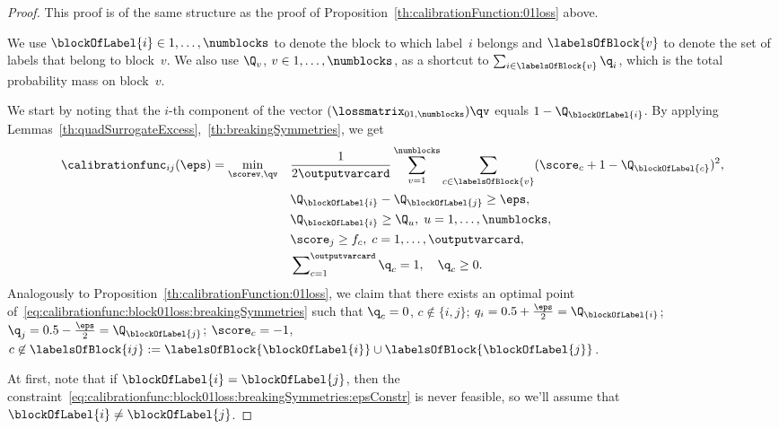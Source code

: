 \documentclass{article}
\begin{document}
\begin{proof}
    This proof is of the same structure as the proof of Proposition~\ref{th:calibrationFunction:01loss} above.
    
    We use $\blockOfLabel{i} \in 1,\dots,\numblocks$ to denote the block to which label~$i$ belongs and $\labelsOfBlock{v}$ to denote the set of labels that belong to block~$v$.
    We also use $\Q_v$, $v\in 1,\dots, \numblocks$, as a shortcut to $\sum_{i \in \labelsOfBlock{v}} \q_i$, which is the total probability mass on block~$v$.
    
    We start by noting that the $i$-th component of the vector $(\lossmatrix_{01,\numblocks}) \qv$ equals $1-\Q_{\blockOfLabel{i}}$.
    By applying Lemmas~\ref{th:quadSurrogateExcess},~\ref{th:breakingSymmetries}, we get
    \begin{align}
    \label{eq:calibrationfunc:block01loss:breakingSymmetries}
    \calibrationfunc_{ij} (\eps) = \min_{\scorev, \qv} \quad & \frac{1}{2\outputvarcard} \sum_{v=1}^\numblocks \sum_{c \in \labelsOfBlock{v}} (\score_c + 1 - \Q_{\blockOfLabel{c}})^2, \\
    \label{eq:calibrationfunc:block01loss:breakingSymmetries:epsConstr}
    & \Q_{\blockOfLabel{i}} - \Q_{\blockOfLabel{j}} \geq \eps, \\
    \notag & \Q_{\blockOfLabel{i}} \geq \Q_u, \;u=1,\dots,\numblocks, \\
    \notag & \score_j \geq f_c, \;c=1,\dots,\outputvarcard, \\
    \notag & \sum\nolimits_{c=1}^{\outputvarcard} \q_c = 1, \quad \q_c \geq 0.
    \end{align}
    Analogously to Proposition~\ref{th:calibrationFunction:01loss}, we claim that there exists an optimal point of~\eqref{eq:calibrationfunc:block01loss:breakingSymmetries} such that $\q_c=0$, $c\not\in\{i,j\}$; $q_i = 0.5 + \frac{\eps}{2} = \Q_{\blockOfLabel{i}}$;  $\q_{j} = 0.5 - \frac{\eps}{2} = \Q_{\blockOfLabel{j}}$; $\score_c = -1$, $c \not\in \labelsOfBlock{ij} := \labelsOfBlock{\blockOfLabel{i}} \cup \labelsOfBlock{\blockOfLabel{j}}$.

    At first, note that if $\blockOfLabel{i} = \blockOfLabel{j}$, then the constraint~\eqref{eq:calibrationfunc:block01loss:breakingSymmetries:epsConstr} is never feasible, so we'll assume that $\blockOfLabel{i} \neq \blockOfLabel{j}$.
    

\end{proof}
\end{document}
